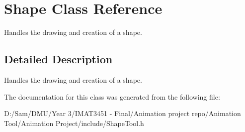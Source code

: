 \hypertarget{class_shape}{}\section{Shape Class Reference}
\label{class_shape}


Handles the drawing and creation of a shape.  




\subsection{Detailed Description}
Handles the drawing and creation of a shape. 

The documentation for this class was generated from the following file\+:\begin{DoxyCompactItemize}
\item 
D\+:/\+Sam/\+D\+M\+U/\+Year 3/\+I\+M\+A\+T3451 -\/ Final/\+Animation project repo/\+Animation Tool/\+Animation Project/include/Shape\+Tool.\+h\end{DoxyCompactItemize}
